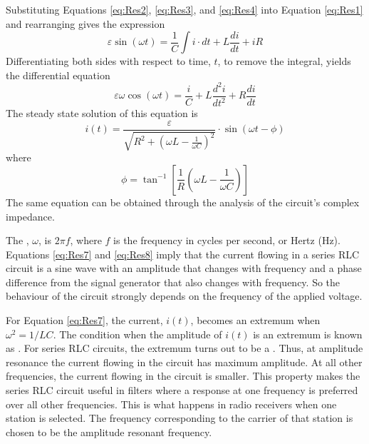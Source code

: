\documentclass[12pt, a4paper, oneside, openright, titlepage]{book}
\begin{document}
\noindent Substituting Equations \ref{eq:Res2}, \ref{eq:Res3}, and \ref{eq:Res4} into Equation \ref{eq:Res1} and rearranging gives the expression \begin{equation}\label{eq:Res5}
    \varepsilon\sin(\omega t) = \frac{1}{C}\int i\cdot dt + L\frac{di}{dt} + iR
\end{equation}
Differentiating both sides with respect to time, $t$, to remove the integral, yields the differential equation \begin{equation}\label{eq:Res6}
    \varepsilon\omega\cos(\omega t) = \frac{i}{C} + L\frac{d^2i}{dt^2} + R\frac{di}{dt}
\end{equation}
The steady state solution of this equation is \begin{equation}\label{eq:Res7}
    i(t) = \frac{\varepsilon}{\sqrt{R^2+\left(\omega L - \frac{1}{\omega C}\right)^2}}\cdot\sin(\omega t - \phi)
\end{equation}
where \begin{equation}\label{eq:Res8}
    \phi = \tan^{-1}\left[\frac{1}{R}\left(\omega L - \frac{1}{\omega C}\right)\right]
\end{equation}
The same equation can be obtained through the analysis of the circuit's complex impedance.

\noindent The , $\omega$, is $2\pi f$, where $f$ is the frequency in cycles per second, or Hertz (Hz). Equations \ref{eq:Res7} and \ref{eq:Res8} imply that the current flowing in a series RLC circuit is a sine wave with an amplitude that changes with frequency and a phase difference from the signal generator that also changes with frequency. So the behaviour of the circuit strongly depends on the frequency of the applied voltage.

\noindent For Equation \ref{eq:Res7}, the current, $i(t)$, becomes an extremum when $\omega^2 = 1/LC$. The condition when the amplitude of $i(t)$ is an extremum is known as . For series RLC circuits, the extremum turns out to be a . Thus, at amplitude resonance the current flowing in the circuit has maximum amplitude. At all other frequencies, the current flowing in the circuit is smaller. This property makes the series RLC circuit useful in filters where a response at one frequency is preferred over all other frequencies. This is what happens in radio receivers when one station is selected. The frequency corresponding to the carrier of that station is chosen to be the amplitude resonant frequency.
\end{document}
